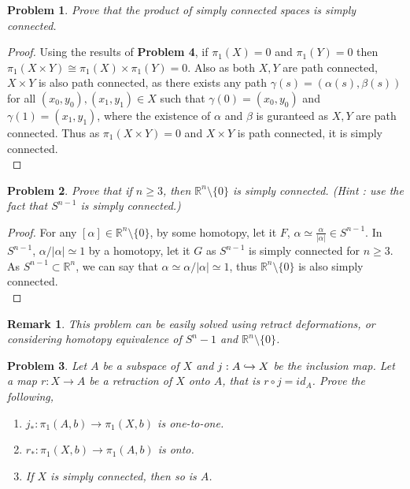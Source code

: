 \documentclass[paper=a4, fontsize=11pt]{scrartcl}
\newtheorem*{remark}{Remark}
\newtheorem{problem}{Problem}
\begin{document}
\begin{problem}
	Prove that the product of simply connected spaces is simply connected.\\
\end{problem}



\begin{proof}
	Using the results of \textbf{Problem 4}, if $\pi_1(X) = 0$ and $\pi_1(Y) = 0$ then $\pi_1(X \times Y) \cong \pi_1(X) \times \pi_1(Y) = 0$. Also as both $X,Y$ are path connected, $X\times Y$ is also path connected, as there exists any path $\gamma(s)=(\alpha(s),\beta(s))$ for all $(x_0,y_0),(x_1,y_1)\in X$ such that $\gamma(0)=(x_0,y_0)$ and $\gamma(1)=(x_1,y_1)$, where the existence of $\alpha$ and $\beta$ is guranteed as $X,Y$ are path connected. Thus as $\pi_1(X\times Y) = 0$ and $X \times Y$ is path connected, it is simply connected.\\
\end{proof}

\begin{problem}
	Prove that if $n \geq 3$, then $\mathbb{R}^n \setminus \{0\}$ is simply connected. (Hint : use the fact that $S^{n-1}$ is simply connected.)\\
\end{problem}

\begin{proof}
	For any $[\alpha] \in \mathbb{R}^n \setminus \{0\}$, by some homotopy, let it $F$, $\alpha \simeq \frac{\alpha}{|\alpha|}\in S^{n-1}$. In $S^{n-1}$, $ \alpha/|\alpha| \simeq 1$ by a homotopy, let it $G$ as $S^{n-1}$ is simply connected for $n\geq 3$. As $S^{n-1} \subset \mathbb{R}^n$, we can say that $\alpha \simeq \alpha/|\alpha| \simeq 1$, thus $\mathbb{R}^n \setminus \{0\}$ is also simply connected. \\
\end{proof}

\begin{remark}
	This problem can be easily solved using retract deformations, or considering homotopy equivalence of $S^n-1$ and $\mathbb{R}^n \setminus \{0\}$. \\
\end{remark}

\begin{problem}
	Let $A$ be a subspace of $X$ and $j:A\xhookrightarrow{}X$ be the inclusion map. Let a map $r:X\to A$ be a retraction of $X$ onto  $A$, that is $r \circ j = id_A$. Prove the following,\\
	\begin{enumerate}[label=(\alph*)]
		\item $j_*:\pi_1(A,b)\to \pi_1(X,b)$ is one-to-one.		
		\item $r_*:\pi_1(X,b)\to \pi_1(A,b)$ is onto.
		\item If $X$ is simply connected, then so is $A$.\\
	\end{enumerate}
\end{problem}
\end{document}
